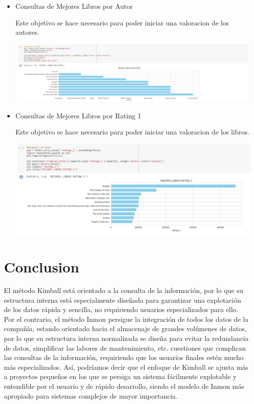 \documentclass[preprint,12pt]{elsarticle}
\begin{document}
\begin{itemize}
\item Consultas de Mejores Libros por Autor 

Este objetivo se hace necesario para poder iniciar una valoracion de los autores.

\begin {center}
\includegraphics[scale= 0.40]{./Imagenes/mejores_libros_p_autor.png}
\end {center}


\item Consultas de Mejores Libros por Rating 1

Este objetivo se hace necesario para poder iniciar una valoracion de los libros.

\begin {center}
\includegraphics[scale= 0.50]{./Imagenes/mejores_libros_rating_1.png}
\end {center}


\end{itemize}


\section{Conclusion}
El método Kimball está orientado a la consulta de la información, por lo que su estructura interna está especialmente diseñada para garantizar una explotación de los datos rápida y sencilla, no requiriendo usuarios especializados para ello. Por el contrario, el método Inmon persigue la integración de todos los datos de la compañía, estando orientado hacia el almacenaje de grandes volúmenes de datos, por lo que su estructura interna normalizada se diseña para evitar la redundancia de datos, simplificar las labores de mantenimiento, etc. cuestiones que complican las consultas de la información, requiriendo que los usuarios finales estén mucho más especializados.
Así, podríamos decir que el enfoque de Kimball se ajusta más a proyectos pequeños en los que se persiga un sistema fácilmente explotable y entendible por el usuario y de rápido desarrollo, siendo el modelo de Inmon más apropiado para sistemas complejos de mayor importancia.
\end{document}
